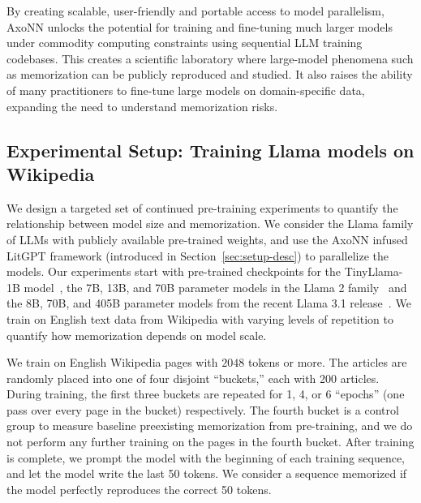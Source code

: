 By creating scalable, user-friendly and portable access to model parallelism,
AxoNN unlocks the potential for training and fine-tuning much larger models
under commodity computing constraints using sequential LLM training codebases.
This creates a scientific laboratory where large-model phenomena
such as memorization can be publicly reproduced and studied. It also raises the
ability of many practitioners to fine-tune large models on domain-specific
data, expanding the need to understand memorization risks.

\subsection{Experimental Setup: Training Llama models on Wikipedia}

We design a targeted set of continued pre-training experiments to quantify the
relationship between model size and memorization. We consider the Llama family
of LLMs with publicly available pre-trained weights, and use the AxoNN infused
LitGPT framework (introduced in Section~\ref{sec:setup-desc}) to parallelize
the models. Our experiments start with pre-trained checkpoints for the
TinyLlama-1B model~\cite{zhang2024tinyllama}, the 7B, 13B, and 70B parameter
models in the Llama 2 family~\cite{touvron2023llama} and the 8B, 70B, and 405B
parameter models from the recent Llama 3.1 release~\cite{dubey2024llama}. We
train on English text data from Wikipedia with varying levels of repetition to quantify how
memorization depends on model scale.

We train on English Wikipedia pages with $2048$ tokens or more. The articles
are randomly placed into one of four disjoint ``buckets,'' each with 200 articles. During
training, the first three buckets are repeated for 1, 4, or 6 ``epochs'' (one
pass over every page in the bucket) respectively. The fourth bucket is a
control group to measure baseline preexisting memorization from pre-training,
and we do not perform any further training on the pages in the fourth bucket. After training is
complete, we prompt the model with the beginning of each training sequence, and
let the model write the last 50 tokens. We consider a sequence memorized if the
model perfectly reproduces the correct 50 tokens.

